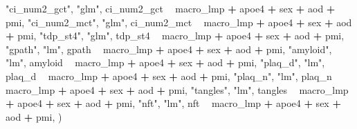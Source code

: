 \documentclass[]{book}
\newenvironment{Shaded}{\begin{snugshade}}{\end{snugshade}}
\newcommand{\NormalTok}[1]{#1}
\newcommand{\OperatorTok}[1]{\textcolor[rgb]{0.81,0.36,0.00}{\textbf{#1}}}
\newcommand{\StringTok}[1]{\textcolor[rgb]{0.31,0.60,0.02}{#1}}
\begin{document}
\begin{Shaded}
\begin{Highlighting}[]
{{{{{  \StringTok{"ci_num2_gct"}\NormalTok{, }\StringTok{"glm"}\NormalTok{, ci_num2_gct }\OperatorTok{~}\StringTok{ }\NormalTok{macro_lmp }\OperatorTok{+}\StringTok{ }\NormalTok{apoe4 }\OperatorTok{+}\StringTok{ }\NormalTok{sex }\OperatorTok{+}\StringTok{ }\NormalTok{aod }\OperatorTok{+}\StringTok{ }\NormalTok{pmi,}
  \StringTok{"ci_num2_mct"}\NormalTok{, }\StringTok{"glm"}\NormalTok{, ci_num2_mct }\OperatorTok{~}\StringTok{ }\NormalTok{macro_lmp }\OperatorTok{+}\StringTok{ }\NormalTok{apoe4 }\OperatorTok{+}\StringTok{ }\NormalTok{sex }\OperatorTok{+}\StringTok{ }\NormalTok{aod }\OperatorTok{+}\StringTok{ }\NormalTok{pmi,}
  \StringTok{"tdp_st4"}\NormalTok{, }\StringTok{"glm"}\NormalTok{, tdp_st4 }\OperatorTok{~}\StringTok{ }\NormalTok{macro_lmp }\OperatorTok{+}\StringTok{ }\NormalTok{apoe4 }\OperatorTok{+}\StringTok{ }\NormalTok{sex }\OperatorTok{+}\StringTok{ }\NormalTok{aod }\OperatorTok{+}\StringTok{ }\NormalTok{pmi,}
  \StringTok{"gpath"}\NormalTok{, }\StringTok{"lm"}\NormalTok{, gpath }\OperatorTok{~}\StringTok{ }\NormalTok{macro_lmp }\OperatorTok{+}\StringTok{ }\NormalTok{apoe4 }\OperatorTok{+}\StringTok{ }\NormalTok{sex }\OperatorTok{+}\StringTok{ }\NormalTok{aod }\OperatorTok{+}\StringTok{ }\NormalTok{pmi,}
  \StringTok{"amyloid"}\NormalTok{, }\StringTok{"lm"}\NormalTok{, amyloid }\OperatorTok{~}\StringTok{ }\NormalTok{macro_lmp }\OperatorTok{+}\StringTok{ }\NormalTok{apoe4 }\OperatorTok{+}\StringTok{ }\NormalTok{sex }\OperatorTok{+}\StringTok{ }\NormalTok{aod }\OperatorTok{+}\StringTok{ }\NormalTok{pmi,}
  \StringTok{"plaq_d"}\NormalTok{, }\StringTok{"lm"}\NormalTok{, plaq_d }\OperatorTok{~}\StringTok{ }\NormalTok{macro_lmp }\OperatorTok{+}\StringTok{ }\NormalTok{apoe4 }\OperatorTok{+}\StringTok{ }\NormalTok{sex }\OperatorTok{+}\StringTok{ }\NormalTok{aod }\OperatorTok{+}\StringTok{ }\NormalTok{pmi,}
  \StringTok{"plaq_n"}\NormalTok{, }\StringTok{"lm"}\NormalTok{, plaq_n }\OperatorTok{~}\StringTok{ }\NormalTok{macro_lmp }\OperatorTok{+}\StringTok{ }\NormalTok{apoe4 }\OperatorTok{+}\StringTok{ }\NormalTok{sex }\OperatorTok{+}\StringTok{ }\NormalTok{aod }\OperatorTok{+}\StringTok{ }\NormalTok{pmi,}
  \StringTok{"tangles"}\NormalTok{, }\StringTok{"lm"}\NormalTok{, tangles }\OperatorTok{~}\StringTok{ }\NormalTok{macro_lmp }\OperatorTok{+}\StringTok{ }\NormalTok{apoe4 }\OperatorTok{+}\StringTok{ }\NormalTok{sex }\OperatorTok{+}\StringTok{ }\NormalTok{aod }\OperatorTok{+}\StringTok{ }\NormalTok{pmi,}
  \StringTok{"nft"}\NormalTok{, }\StringTok{"lm"}\NormalTok{, nft }\OperatorTok{~}\StringTok{ }\NormalTok{macro_lmp }\OperatorTok{+}\StringTok{ }\NormalTok{apoe4 }\OperatorTok{+}\StringTok{ }\NormalTok{sex }\OperatorTok{+}\StringTok{ }\NormalTok{aod }\OperatorTok{+}\StringTok{ }\NormalTok{pmi,}
\NormalTok{)}

}}}}}
\end{Highlighting}
\end{Shaded}
\end{document}
